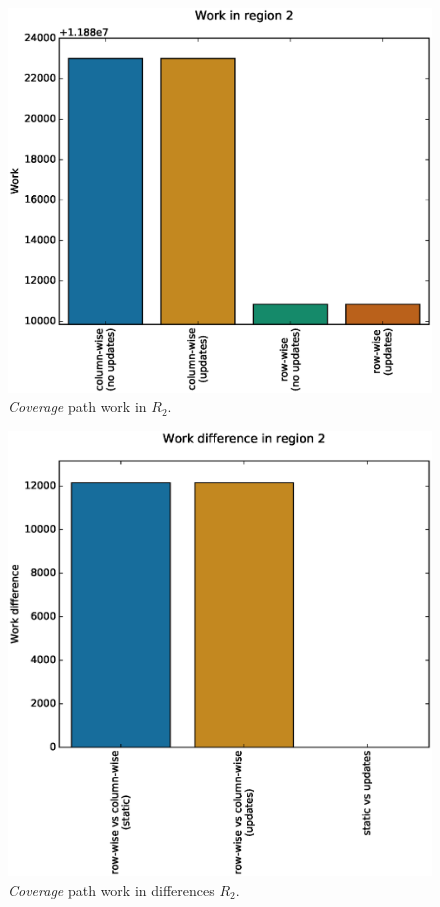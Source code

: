 \documentclass{tamuccthesis}
\begin{document}
\begin{figure}[H]
    \captionsetup{justification=centering}
    \centering
    \includegraphics[width=\textwidth,trim={0cm 0cm 0cm 0.75cm},clip]{work_r2.eps}
    \caption{\textit{Coverage} path work in $R_2$.}
    \label{fig:coverage_noterrain_work_r2}
\end{figure}
\begin{figure}[H]
    \captionsetup{justification=centering}
    \centering
    \includegraphics[width=\textwidth,trim={0cm 0cm 0cm 0.75cm},clip]{diff_r2.eps}
    \caption{\textit{Coverage} path work in differences $R_2$.}
    \label{fig:coverage_noterrain_diff_r2}
\end{figure}
\end{document}
